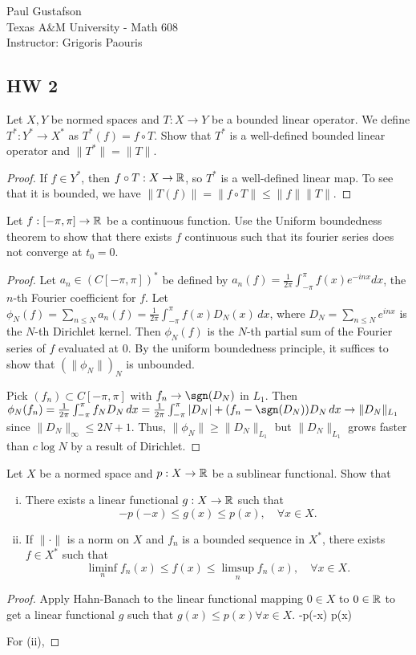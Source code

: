\documentclass{article}
\begin{document}
\noindent Paul Gustafson\\
\noindent Texas A\&M University - Math 608 \\ 
\noindent Instructor: Grigoris Paouris

\subsection*{HW 2}
 Let $X, Y$ be normed spaces and $T: X \to Y$ be a bounded linear operator.  We define $T^*: Y^* \to X^*$ as $T^*(f) = f \circ T$. Show that $T^*$ is a well-defined bounded linear operator and $\|T^*\| = \|T\|$.

\begin{proof}
If $f \in Y^*$, then $f \circ T: X \to \mathbb{R}$, so $T^*$ is a well-defined linear map. To see that it is bounded, we have $\|T(f)\| = \|f \circ T\| \le \|f\| \|T\|$.
\end{proof}


 Let $f : [-\pi, \pi] \to \mathbb{R}$ be a continuous function. Use the Uniform boundedness theorem to show that there exists $f$ continuous such that its fourier series does not converge at $t_0 = 0$. %
\begin{proof}
Let $a_n \in (C[-\pi, \pi])^*$ be defined by $a_n(f) = \frac 1 {2\pi} \int_{-\pi}^\pi f(x) e^{-inx} dx$, the $n$-th Fourier coefficient for $f$. Let $\phi_N(f) = \sum_{n \le N} a_n(f) = \frac 1 {2\pi} \int_{-\pi}^\pi f(x) D_N(x) \,dx$, where $D_N = \sum_{n\le N} e^{inx}$ is the $N$-th Dirichlet kernel. Then $\phi_N(f)$ is the $N$-th partial sum of the Fourier series of $f$ evaluated at $0$. By the uniform boundedness principle, it suffices to show that $(\|\phi_N\|)_N$ is unbounded.

Pick $(f_n) \subset C[-\pi, \pi]$ with $f_n \to \sgn(D_N)$ in $L_1$.  Then $\phi_N(f_n) = \frac 1 {2\pi} \int_{-\pi}^\pi f_N D_N \,dx = \frac 1 {2\pi} \int_{-\pi}^\pi  |D_N| + (f_n - \sgn(D_N)) D_N \,dx \to \|D_N\|_{L_1}$ since $\|D_N\|_\infty \le 2N + 1$.  Thus, $\|\phi_N\| \ge \|D_N\|_{L_1}$ but $\|D_N\|_{L_1}$ grows faster than $c \log N$ by a result of Dirichlet.
\end{proof}

 Let $X$ be a normed space and $p: X \to \mathbb{R}$ be a sublinear functional. Show that 
\begin{enumerate}[i)]
\item There exists a linear functional $g : X \to \mathbb{R}$ such that 
$$ -p(-x) \le g(x) \le p(x), \quad \forall x \in X.$$
\item If $\|\cdot\|$ is a norm on $X$ and $f_n$ is a bounded sequence in $X^*$, there exists $f \in X^*$ such that 
$$\liminf_n f_n(x) \le f(x) \le \limsup_n f_n(x) , \quad \forall x \in X.$$
\end{enumerate}
\begin{proof}
Apply Hahn-Banach to the linear functional mapping $0 \in X$ to $0 \in \mathbb{R}$ to get a linear functional $g$ such that $g(x) \le p(x) \forall x \in X$.
-p(-x) \le p(x)

For (ii), 

\end{proof}
\end{document}
